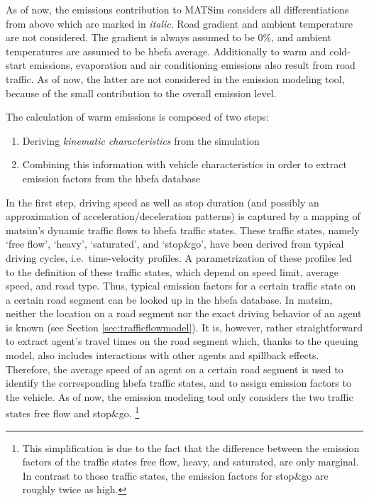 As of now, the emissions contribution to MATSim considers all differentiations from above which are marked in \emph{italic}. Road gradient and ambient temperature are not considered. The gradient is always assumed to be 0\%, and ambient temperatures are assumed to be \gls{hbefa} average.
%
Additionally to warm and cold-start emissions, evaporation and air conditioning emissions also result from road traffic. As of now, the latter are not considered in the emission modeling tool, because of the small contribution to the overall emission level.

The calculation of warm emissions is composed of two steps:
%
\begin{enumerate}
 \item Deriving \emph{kinematic characteristics} from the simulation
 \item Combining this information with vehicle characteristics in order to 
 extract emission factors from the \gls{hbefa} database
\end{enumerate}
%
In the first step, driving speed as well as stop duration (and possibly an 
approximation of acceleration/deceleration patterns) is captured by a 
mapping of \gls{matsim}'s dynamic traffic flows to \gls{hbefa} traffic states. 
These traffic states, namely `free flow', `heavy', `saturated', and `stop\&go', 
have been derived from typical driving cycles, i.e.\ time-velocity profiles. 
A parametrization of these profiles led to the definition of these traffic 
states, which depend on speed limit, average speed, and road type. Thus, 
typical emission factors for a certain traffic state on a certain road segment 
can be looked up in the \gls{hbefa} database.
%
In \gls{matsim}, neither the location on a road segment nor the exact driving behavior of an agent is known (see Section \ref{sec:trafficflowmodel}).
%
%
It is, however, rather straightforward to extract agent's travel times on the road segment which, thanks to the queuing model, also includes interactions with other agents and spillback effects.
%
Therefore, the average speed of an agent on a certain road segment is used to 
identify the corresponding \gls{hbefa} traffic states, and to assign emission 
factors to the vehicle. As of now, the emission modeling tool only considers 
the two traffic states free flow and stop\&go.%
% 
\footnote{
%
This simplification is due to the fact that the difference between the 
emission factors of the traffic states free flow, heavy, and saturated, are 
only marginal. In contrast to those traffic states, the emission factors for 
stop\&go are roughly twice as high.
%
}
